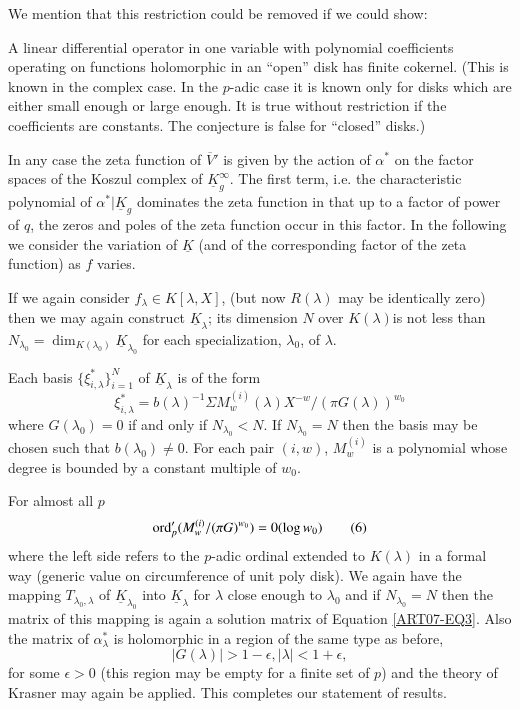 We mention that this restriction could be removed if we could show:

\begin{conjecture*}
A linear differential operator in one variable with polynomial coefficients operating on functions holomorphic in an ``open'' disk has finite cokernel. (This is known in the complex case. In the $p$-adic case it is known only for disks which are either small enough or large enough. It is true without restriction if the coefficients are constants. The conjecture is false for ``closed'' disks.)
\end{conjecture*}

In any case the zeta function of $\overline{V}'$ is given by the action of $\alpha^{*}$ on the factor spaces of the Koszul complex of $\underline{K}^{\infty}_{g}$. The first term, i.e. the characteristic polynomial of $\alpha^{*}|\underline{K}_{g}$ dominates the zeta function in that up to a factor of power of $q$, the zeros and poles of the zeta function occur in this factor. In the following we consider the variation of $\underline{K}$ (and of the corresponding factor of the zeta function) as $f$ varies.

If we again consider $f_{\lambda}\in K[\lambda,X]$, (but now $R(\lambda)$ may be identically zero) then we may again construct $\underline{K}_{\lambda}$; its dimension $N$ over $K(\lambda)$\pageoriginale is not less than $N_{\lambda_{0}}=\dim_{K(\lambda_{0})}\underline{K}_{\lambda_{0}}$ for each specialization, $\lambda_{0}$, of $\lambda$.

\begin{theorem*}
Each basis $\{\xi^{*}_{i,\lambda}\}^{N}_{i=1}$ of $\underline{K}_{\lambda}$ is of the form
\begin{equation*}
\xi^{*}_{i,\lambda}=b(\lambda)^{-1}\Sigma M_{w}^{(i)}(\lambda)X^{-w}/(\pi G(\lambda))^{w_{0}}\tag{5}\label{art07-eq5}
\end{equation*}
where $G(\lambda_{0})=0$ if and only if $N_{\lambda_{0}}<N$. If $N_{\lambda_{0}}=N$ then the basis may be chosen such that $b(\lambda_{0})\neq 0$. For each pair $(i,w)$, $M^{(i)}_{w}$ is a polynomial whose degree is bounded by a constant multiple of $w_{0}$.
\end{theorem*}

For almost all $p$
\begin{equation*}
\operatorname{\mathrm{ord}}'_{p}(M^{(i)}_{w}/(\pi G)^{w_{0}})=0(\log w_{0})\tag{6}\label{art07-eq6}
\end{equation*}
where the left side refers to the $p$-adic ordinal extended to $K(\lambda)$ in a formal way (generic value on circumference of unit poly disk). We again have the mapping $T_{\lambda_{0},\lambda}$ of $\underline{K}_{\lambda_{0}}$ into $\underline{K}_{\lambda}$ for $\lambda$ close enough to $\lambda_{0}$ and if $N_{\lambda_{0}}=N$ then the matrix of this mapping is again a solution matrix of Equation \eqref{ART07-EQ3}. Also the matrix of $\alpha^{*}_{\lambda}$ is holomorphic in a region of the same type as before,
$$
|G(\lambda)|>1-\epsilon, |\lambda|<1+\epsilon,
$$
for some $\epsilon>0$ (this region may be empty for a finite set of $p$) and the theory of Krasner may again be applied. This completes our statement of results.

